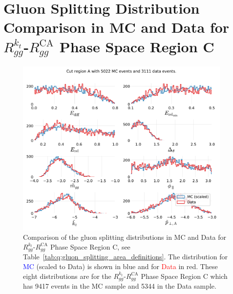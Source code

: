 \section[Gluon Splitting Distribution Comparison in MC and Data for Phase Space Region C]{Gluon Splitting Distribution Comparison in MC and Data for $R_{gg}^{k_t}$-$R_{gg}^\mathrm{CA}$ Phase Space Region C}
\begin{figure}[h!]
  \centerfloat
  \includegraphics[width=0.95\textwidth, trim=0 0 0 0, clip, page=3]{figures/quarks/gtag-R_kt_CA_histograms-down_sample=1.00-ML_vars=vertex-selection=b-ejet_min=4-n_iter_RS_lgb=99-n_iter_RS_xgb=9-cdot_cut=0.90-version=19-njet=4.pdf}
  \caption[Gluon Splitting Distribution Comparison in MC and Data for Phase Space Region C]
          {Comparison of the gluon splitting distributions in MC and Data for $R_{gg}^{k_t}$-$R_{gg}^\mathrm{CA}$ Phase Space Region C, see Table~\ref{tab:q:gluon_splitting_area_definitions}. The distribution for \textcolor{blue}{MC} (scaled to Data) is shown in blue and for \textcolor{red}{Data} in red. These eight distributions are for the $R_{gg}^{k_t}$-$R_{gg}^\mathrm{CA}$ Phase Space Region C which has \num{9417} events in the MC sample and \num{5344} in the Data sample. } 
  \label{fig:q:R_kt_CA_cut_C}
\end{figure}
\clearpage


